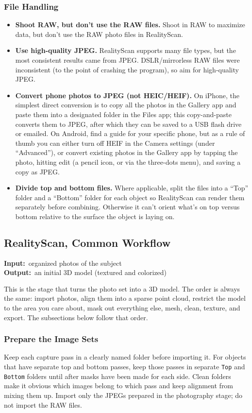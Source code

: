 \documentclass[11pt]{article}
\newcommand{\inout}[2]{%
    \begin{stageio}%
    \textbf{Input:}~#1\\[2pt]%
    \textbf{Output:}~#2%
    \end{stageio}%
}
\begin{document}
\subsubsection{File Handling}
\begin{itemize}[leftmargin=1.4em]
  \item \textbf{Shoot RAW, but don't use the RAW files.} Shoot in RAW to maximize data, but don't use the RAW photo files in RealityScan.
  \item \textbf{Use high-quality JPEG.} RealityScan supports many file types, but the most consistent results came from JPEG. DSLR/mirrorless RAW files were inconsistent (to the point of crashing the program), so aim for high-quality JPEG.
  \item \textbf{Convert phone photos to JPEG (not HEIC/HEIF).} On iPhone, the simplest direct conversion is to copy all the photos in the Gallery app and paste them into a designated folder in the Files app; this copy-and-paste converts them to JPEG, after which they can be saved to a USB flash drive or emailed. On Android, find a guide for your specific phone, but as a rule of thumb you can either turn off HEIF in the Camera settings (under ``Advanced''), or convert existing photos in the Gallery app by tapping the photo, hitting edit (a pencil icon, or via the three-dots menu), and saving a copy as JPEG.
  \item \textbf{Divide top and bottom files.} Where applicable, split the files into a ``Top'' folder and a ``Bottom'' folder for each object so RealityScan can render them separately before combining. Otherwise it can't orient what's on top versus bottom relative to the surface the object is laying on.
\end{itemize}

\subsection{RealityScan, Common Workflow}
\label{sec:common-rs}
\inout{organized photos of the subject}{an initial 3D model (textured and colorized)}
This is the stage that turns the photo set into a 3D model. The order is always the same: import photos, align them into a sparse point cloud, restrict the model to the area you care about, mask out everything else, mesh, clean, texture, and export. The subsections below follow that order.

\subsubsection{Prepare the Image Sets}
Keep each capture pass in a clearly named folder before importing it. For objects that have separate top and bottom passes, keep those passes in separate \texttt{Top} and \texttt{Bottom} folders until after masks have been made for each side. Clean folders make it obvious which images belong to which pass and keep alignment from mixing them up. Import only the JPEGs prepared in the photography stage; do not import the RAW files.
\end{document}
